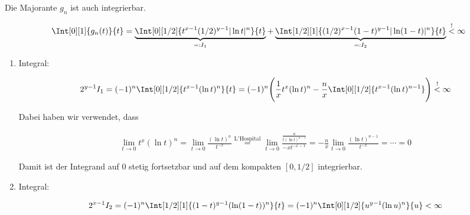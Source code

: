 \begin{solution}
Die Majorante $g_n$ ist auch integrierbar.

\begin{align*}
    \Int[0][1]{g_n(t)}{t}
    =
    \underbrace
    {
        \Int[0][1/2]
        {
            t^{x-1} (1/2)^{y-1} |\ln t|^n
        }{t}    
    }_{
        =: I_1
    }
    +
    \underbrace
    {
        \Int[1/2][1]
        {
            (1/2)^{x-1} (1 - t)^{y-1} |\ln(1 - t)|^n
        }{t}
    }_{
        =: I_2
    }
    \stackrel{!}{<}
    \infty
\end{align*}

\begin{enumerate}[label = \arabic*.]

    \item Integral:

    \begin{align*}
        2^{y-1} I_1
        =
        (-1)^n
        \Int[0][1/2]{t^{x-1} (\ln t)^n}{t}
        =
        (-1)^n
        \Bigg (
            \frac{1}{x}
            t^x (\ln t)^n
            -
            \frac{n}{x}
            \Int[0][1/2]{t^{x-1} (\ln t)^{n-1}}
        \Bigg )
        \stackrel{!}{<}
        \infty
    \end{align*}
    
    Dabei haben wir verwendet, dass
    
    \begin{align*}
        \lim_{t \to 0}
        t^x (\ln t)^n
        =
        \lim_{t \to 0}
        \frac
        {
            (\ln t)^n
        }{
            t^{-x}
        }
        \stackrel
        {
            \mathrm{L'Hospital}
        }{=}
        \lim_{t \to 0}
        \frac
        {
            \frac{n}{t (\ln t)^{n-1}}
        }{-x t^{-x - 1}}
        =
        -\frac{n}{x}
        \lim_{t \to 0}
        \frac
        {
            (\ln t)^{n-1}
        }{
            t^{-x}
        }
        =
        \cdots
        =
        0
    \end{align*}
    
    Damit ist der Integrand auf $0$ stetig fortsetzbar und auf dem kompakten $[0, 1/2]$ integrierbar.

    \item Integral:

    \begin{align*}
        2^{x-1} I_2
        =
        (-1)^n
        \Int[1/2][1]
        {
            (1 - t)^{y-1} (\ln(1 - t))^n
        }{t}
        =
        (-1)^n
        \Int[0][1/2]
        {
            u^{y-1} (\ln u)^n
        }{u}
        <
        \infty
    \end{align*}
    

\end{enumerate}
\end{solution}
